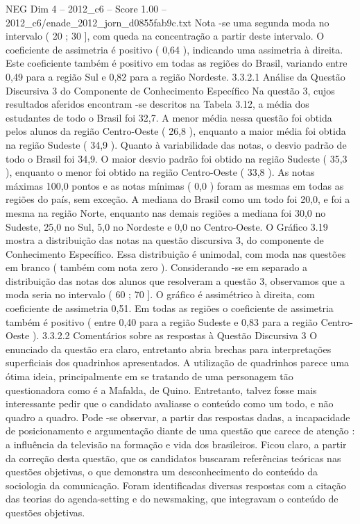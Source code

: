 \begin{textsample}{NEG Dim 4 – 2012\_c6 – Score 1.00 – 2012\_c6/enade\_2012\_jorn\_d0855fab9c.txt}
Nota -se uma segunda moda no intervalo ( 20 ; 30 ], com queda na concentração a partir deste intervalo.
O coeficiente de assimetria é positivo ( 0,64 ), indicando uma assimetria à direita.
Este coeficiente também é positivo em todas as regiões do Brasil, variando entre 0,49 para a região Sul e 0,82 para a região Nordeste. 3.3.2.1 Análise da Questão Discursiva 3 do Componente de Conhecimento Específico Na questão 3, cujos resultados aferidos encontram -se descritos na Tabela 3.12, a média dos estudantes de todo o Brasil foi 32,7.
A menor média nessa questão foi obtida pelos alunos da região Centro-Oeste ( 26,8 ), enquanto a maior média foi obtida na região Sudeste ( 34,9 ).
Quanto à variabilidade das notas, o desvio padrão de todo o Brasil foi 34,9.
O maior desvio padrão foi obtido na região Sudeste ( 35,3 ), enquanto o menor foi obtido na região Centro-Oeste ( 33,8 ).
As notas máximas 100,0 pontos e as notas mínimas ( 0,0 ) foram as mesmas em todas as regiões do país, sem exceção.
A mediana do Brasil como um todo foi 20,0, e foi a mesma na região Norte, enquanto nas demais regiões a mediana foi 30,0 no Sudeste, 25,0 no Sul, 5,0 no Nordeste e 0,0 no Centro-Oeste.
O Gráfico 3.19 mostra a distribuição das notas na questão discursiva 3, do componente de Conhecimento Específico.
Essa distribuição é unimodal, com moda nas questões em branco ( também com nota zero ).
Considerando -se em separado a distribuição das notas dos alunos que resolveram a questão 3, observamos que a moda seria no intervalo ( 60 ; 70 ].
O gráfico é assimétrico à direita, com coeficiente de assimetria 0,51.
Em todas as regiões o coeficiente de assimetria também é positivo ( entre 0,40 para a região Sudeste e 0,83 para a região Centro-Oeste ). 3.3.2.2 Comentários sobre as respostas à Questão Discursiva 3 O enunciado da questão era claro, entretanto abria brechas para interpretações superficiais dos quadrinhos apresentados.
A utilização de quadrinhos parece uma ótima ideia, principalmente em se tratando de uma personagem tão questionadora como é a Mafalda, de Quino.
Entretanto, talvez fosse mais interessante pedir que o candidato avaliasse o conteúdo como um todo, e não quadro a quadro.
Pode -se observar, a partir das respostas dadas, a incapacidade de posicionamento e argumentação diante de uma questão que carece de atenção : a influência da televisão na formação e vida dos brasileiros.
Ficou claro, a partir da correção desta questão, que os candidatos buscaram referências teóricas nas questões objetivas, o que demonstra um desconhecimento do conteúdo da sociologia da comunicação.
Foram identificadas diversas respostas com a citação das teorias do agenda-setting e do newsmaking, que integravam o conteúdo de questões objetivas.

\end{textsample}
